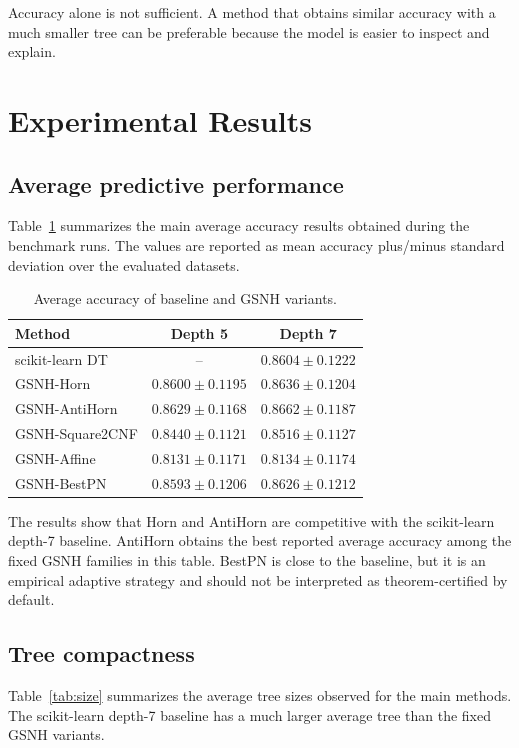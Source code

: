 \documentclass[11pt,a4paper]{article}
\begin{document}
Accuracy alone is not sufficient. A method that obtains similar accuracy with a much smaller tree can be preferable because the model is easier to inspect and explain.

\section{Experimental Results}

\subsection{Average predictive performance}

Table~\ref{tab:accuracy} summarizes the main average accuracy results obtained during the benchmark runs. The values are reported as mean accuracy plus/minus standard deviation over the evaluated datasets.

\begin{table}[h]
\centering
\caption{Average accuracy of baseline and GSNH variants.}
\label{tab:accuracy}
\begin{tabular}{lcc}
\toprule
Method & Depth 5 & Depth 7 \\
\midrule
scikit-learn DT & -- & $0.8604 \pm 0.1222$ \\
GSNH-Horn & $0.8600 \pm 0.1195$ & $0.8636 \pm 0.1204$ \\
GSNH-AntiHorn & $0.8629 \pm 0.1168$ & $0.8662 \pm 0.1187$ \\
GSNH-Square2CNF & $0.8440 \pm 0.1121$ & $0.8516 \pm 0.1127$ \\
GSNH-Affine & $0.8131 \pm 0.1171$ & $0.8134 \pm 0.1174$ \\
GSNH-BestPN & $0.8593 \pm 0.1206$ & $0.8626 \pm 0.1212$ \\
\bottomrule
\end{tabular}
\end{table}

The results show that Horn and AntiHorn are competitive with the scikit-learn depth-7 baseline. AntiHorn obtains the best reported average accuracy among the fixed GSNH families in this table. BestPN is close to the baseline, but it is an empirical adaptive strategy and should not be interpreted as theorem-certified by default.

\subsection{Tree compactness}

Table~\ref{tab:size} summarizes the average tree sizes observed for the main methods. The scikit-learn depth-7 baseline has a much larger average tree than the fixed GSNH variants.
\end{document}
